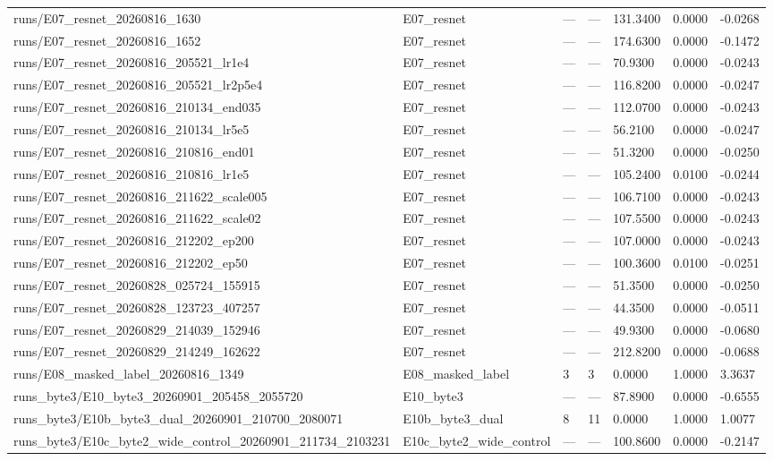 \begin{tabular}{lllllll}
runs/E07_resnet_20260816_1630 & E07_resnet & — & — & 131.3400 & 0.0000 & -0.0268 \\
runs/E07_resnet_20260816_1652 & E07_resnet & — & — & 174.6300 & 0.0000 & -0.1472 \\
runs/E07_resnet_20260816_205521_lr1e4 & E07_resnet & — & — & 70.9300 & 0.0000 & -0.0243 \\
runs/E07_resnet_20260816_205521_lr2p5e4 & E07_resnet & — & — & 116.8200 & 0.0000 & -0.0247 \\
runs/E07_resnet_20260816_210134_end035 & E07_resnet & — & — & 112.0700 & 0.0000 & -0.0243 \\
runs/E07_resnet_20260816_210134_lr5e5 & E07_resnet & — & — & 56.2100 & 0.0000 & -0.0247 \\
runs/E07_resnet_20260816_210816_end01 & E07_resnet & — & — & 51.3200 & 0.0000 & -0.0250 \\
runs/E07_resnet_20260816_210816_lr1e5 & E07_resnet & — & — & 105.2400 & 0.0100 & -0.0244 \\
runs/E07_resnet_20260816_211622_scale005 & E07_resnet & — & — & 106.7100 & 0.0000 & -0.0243 \\
runs/E07_resnet_20260816_211622_scale02 & E07_resnet & — & — & 107.5500 & 0.0000 & -0.0243 \\
runs/E07_resnet_20260816_212202_ep200 & E07_resnet & — & — & 107.0000 & 0.0000 & -0.0243 \\
runs/E07_resnet_20260816_212202_ep50 & E07_resnet & — & — & 100.3600 & 0.0100 & -0.0251 \\
runs/E07_resnet_20260828_025724_155915 & E07_resnet & — & — & 51.3500 & 0.0000 & -0.0250 \\
runs/E07_resnet_20260828_123723_407257 & E07_resnet & — & — & 44.3500 & 0.0000 & -0.0511 \\
runs/E07_resnet_20260829_214039_152946 & E07_resnet & — & — & 49.9300 & 0.0000 & -0.0680 \\
runs/E07_resnet_20260829_214249_162622 & E07_resnet & — & — & 212.8200 & 0.0000 & -0.0688 \\
runs/E08_masked_label_20260816_1349 & E08_masked_label & 3 & 3 & 0.0000 & 1.0000 & 3.3637 \\
runs_byte3/E10_byte3_20260901_205458_2055720 & E10_byte3 & — & — & 87.8900 & 0.0000 & -0.6555 \\
runs_byte3/E10b_byte3_dual_20260901_210700_2080071 & E10b_byte3_dual & 8 & 11 & 0.0000 & 1.0000 & 1.0077 \\
runs_byte3/E10c_byte2_wide_control_20260901_211734_2103231 & E10c_byte2_wide_control & — & — & 100.8600 & 0.0000 & -0.2147 \\

\end{tabular}
